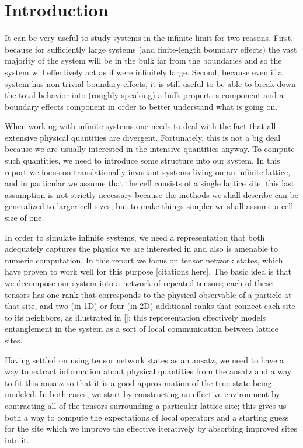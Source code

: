 \documentclass{report}
\begin{document}
\part*{Introduction}

It can be very useful to study systems in the infinite limit for two reasons.  First, because for sufficiently large systems (and finite-length boundary effects) the vast majority of the system will be in the bulk far from the boundaries and so the system will effectively act as if were infinitely large.  Second, because even if a system has non-trivial boundary effects, it is still useful to be able to break down the total behavior into (roughly speaking) a bulk properties component and a boundary effects component in order to better understand what is going on.

When working with infinite systems one needs to deal with the fact that all extensive physical quantities are divergent.  Fortunately, this is not a big deal because we are usually interested in the intensive quantities anyway.  To compute such quantities, we need to introduce some structure into our system.  In this report we focus on translationally invariant systems living on an infinite lattice, and in particular we assume that the cell consists of a single lattice site;  this last assumption is not strictly necessary because the methods we shall describe can be generalized to larger cell sizes, but to make things simpler we shall assume a cell size of one.

In order to simulate infinite systems, we need a representation that both adequately captures the physics we are interested in and also is amenable to numeric computation.  In this report we focus on tensor network states, which have proven to work well for this purpose [citations here].  The basic idea is that we decompose our system into a network of repeated tensors; each of these tensors has one rank that corresponds to the physical observable of a particle at that site, and two (in 1D) or four (in 2D) additional ranks that connect each site to its neighbors, as illustrated in [];  this representation effectively models entanglement in the system as a sort of local communication between lattice sites.

Having settled on using tensor network states as an ansatz, we need to have a way to extract information about physical quantities from the ansatz and a way to fit this ansatz so that it is a good approximation of the true state being modeled.  In both cases, we start by constructing an effective environment by contracting all of the tensors surrounding a particular lattice site; this gives us both a way to compute the expectations of local operators and a starting guess for the site which we improve the effective iteratively by absorbing improved sites into it.
\end{document}
